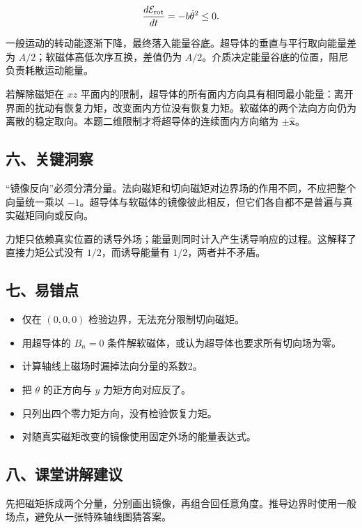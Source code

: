 \documentclass[12pt,a4paper,fontset=fandol]{ctexart}
\providecommand{\tightlist}{\setlength{\itemsep}{0pt}\setlength{\parskip}{0pt}}
\begin{document}
\[
\frac{d\mathcal E_{\rm rot}}{dt}=-b\dot\theta^2\le0.
\]

一般运动的转动能逐渐下降，最终落入能量谷底。超导体的垂直与平行取向能量差为
\(A/2\)；软磁体高低次序互换，差值仍为
\(A/2\)。介质决定能量谷底的位置，阻尼负责耗散运动能量。

若解除磁矩在 \(xz\)
平面内的限制，超导体的所有面内方向具有相同最小能量：离开界面的扰动有恢复力矩，改变面内方位没有恢复力矩。软磁体的两个法向方向仍为离散的稳定取向。本题二维限制才将超导体的连续面内方向缩为
\(\pm\hat{\boldsymbol x}\)。

\subsection{六、关键洞察}\label{ux516dux5173ux952eux6d1eux5bdf-2}

``镜像反向''必须分清分量。法向磁矩和切向磁矩对边界场的作用不同，不应把整个向量统一乘以
\(-1\)。超导体与软磁体的镜像彼此相反，但它们各自都不是普遍与真实磁矩同向或反向。

力矩只依赖真实位置的诱导外场；能量则同时计入产生诱导响应的过程。这解释了直接力矩公式没有
\(1/2\)，而诱导能量有 \(1/2\)，两者并不矛盾。

\subsection{七、易错点}\label{ux4e03ux6613ux9519ux70b9-2}

\begin{itemize}
\tightlist
\item
  仅在 \((0,0,0)\) 检验边界，无法充分限制切向磁矩。
\item
  用超导体的 \(B_n=0\) 条件解软磁体，或认为超导体也要求所有切向场为零。
\item
  计算轴线上磁场时漏掉法向分量的系数2。
\item
  把 \(\theta\) 的正方向与 \(y\) 力矩方向对应反了。
\item
  只列出四个零力矩方向，没有检验恢复力矩。
\item
  对随真实磁矩改变的镜像使用固定外场的能量表达式。
\end{itemize}

\subsection{八、课堂讲解建议}\label{ux516bux8bfeux5802ux8bb2ux89e3ux5efaux8bae-2}

先把磁矩拆成两个分量，分别画出镜像，再组合回任意角度。推导边界时使用一般场点，避免从一张特殊轴线图猜答案。
\end{document}
